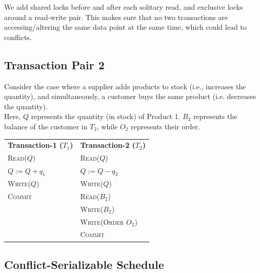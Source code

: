 \documentclass[12pt]{report}
\begin{document}
    \vspace*{10pt}
    We add shared locks before and after each solitary read, and exclusive locks around a read-write pair.
    This makes sure that no two transactions are accessing/altering the same data point at the same time,
    which could lead to conflicts.

    \pagebreak

    \subsection*{Transaction Pair 2}
    Consider the case where a supplier adds products to stock (i.e., increases the quantity), and
    simultaneously, a customer buys the same product (i.e. decreases the quantity). \\
    Here, $Q$ represents the quantity (in stock) of Product 1. $B_{2}$ represents the balance of the customer in
    $T_{2}$, while $O_{2}$ represents their order.

    \begin{center}
        \begin{adjustbox}{width=\textwidth}
            \begin{tabularx}{\textwidth}{|X|X|}
            \hline
            \multirow{2}{*}{\textbf{Transaction-1 ($T_{1}$)}} & \multirow{2}{*}{\textbf{Transaction-2 ($T_{2}$)}} \\
            & \\ \hline
            \textsc{Read($Q$)} & \textsc{Read($Q$)} \\
            \textsc{$Q := Q + q_{1}$} & \textsc{$Q := Q - q_{2}$} \\
            \textsc{Write($Q$)} & \textsc{Write($Q$)} \\
            \textsc{Commit} & \textsc{Read($B_{2}$)} \\
            & \textsc{Write($B_{2}$)} \\
            & \textsc{Write(Order $O_{2}$)} \\
            & \textsc{Commit} \\
            \hline
            \end{tabularx}
        \end{adjustbox}
    \end{center}
    \vspace*{5pt}

    \subsection*{Conflict-Serializable Schedule}
\end{document}
